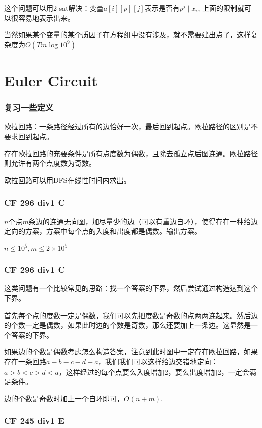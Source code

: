 \documentclass[10pt]{beamer}
\begin{document}
\begin{CJK}{UTF8}{gkai}
\begin{spacing}{1.1}
\begin{frame}
	这个问题可以用2-sat解决：变量$a[i][p][j]$表示是否有$p^j \mid x_i$, 上面的限制就可以很容易地表示出来。
	
	当然如果某个变量的某个质因子在方程组中没有涉及，就不需要建出点了，这样复杂度为$O(Tm\log 10^9)$
\end{frame}

\section{Euler Circuit}

\begin{frame}
\frametitle{复习一些定义}

	欧拉回路：一条路径经过所有的边恰好一次，最后回到起点。欧拉路径的区别是不要求回到起点。\pause

	存在欧拉回路的充要条件是所有点度数为偶数，且除去孤立点后图连通。欧拉路径则允许有两个点度数为奇数。

	欧拉回路可以用DFS在线性时间内求出。

\end{frame}

\begin{frame}
\frametitle{CF 296 div1 C}
	
	$n$个点$m$条边的连通无向图，加尽量少的边（可以有重边自环），使得存在一种给边定向的方案，方案中每个点的入度和出度都是偶数。输出方案。

	$n \le 10^5, m \le 2 \times 10^5$
	
\end{frame}

\begin{frame}
\frametitle{CF 296 div1 C}

	这类问题有一个比较常见的思路：找一个答案的下界，然后尝试通过构造达到这个下界。\pause

	首先每个点的度数一定是偶数，我们可以先把度数是奇数的点两两连起来。然后边的个数一定是偶数，如果此时边的个数是奇数，那么还要加上一条边。这显然是一个答案的下界。 \pause
	
	如果边的个数是偶数考虑怎么构造答案，注意到此时图中一定存在欧拉回路，如果存在一条回路$a - b - c - d - a$，我们我们可以这样给边交错地定向：$a > b < c > d < a$，这样经过的每个点要么入度增加2，要么出度增加2，一定会满足条件。\pause
	
	边的个数是奇数时加上一个自环即可，$O(n + m)$.
	
\end{frame}

\begin{frame}
\frametitle{CF 245 div1 E}


\end{frame}
\end{spacing}
\end{CJK}
\end{document}
